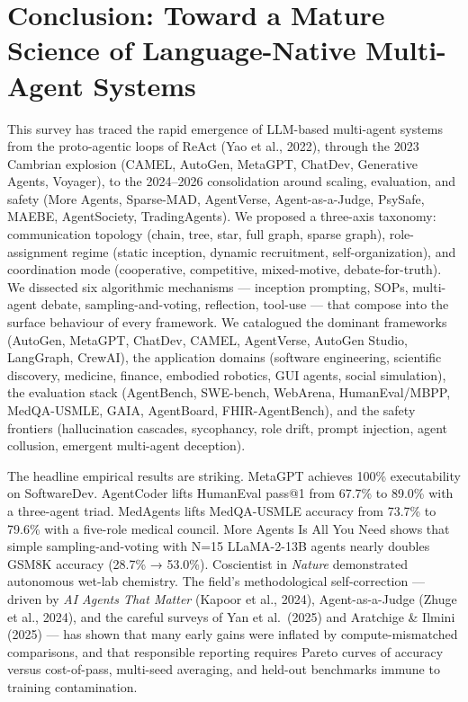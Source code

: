 \section{Conclusion: Toward a Mature Science of Language-Native Multi-Agent Systems}\label{conclusion-toward-a-mature-science-of-language-native-multi-agent-systems}

This survey has traced the rapid emergence of LLM-based multi-agent systems from the proto-agentic loops of ReAct (Yao et al., 2022), through the 2023 Cambrian explosion (CAMEL, AutoGen, MetaGPT, ChatDev, Generative Agents, Voyager), to the 2024--2026 consolidation around scaling, evaluation, and safety (More Agents, Sparse-MAD, AgentVerse, Agent-as-a-Judge, PsySafe, MAEBE, AgentSociety, TradingAgents). We proposed a three-axis taxonomy: communication topology (chain, tree, star, full graph, sparse graph), role-assignment regime (static inception, dynamic recruitment, self-organization), and coordination mode (cooperative, competitive, mixed-motive, debate-for-truth). We dissected six algorithmic mechanisms --- inception prompting, SOPs, multi-agent debate, sampling-and-voting, reflection, tool-use --- that compose into the surface behaviour of every framework. We catalogued the dominant frameworks (AutoGen, MetaGPT, ChatDev, CAMEL, AgentVerse, AutoGen Studio, LangGraph, CrewAI), the application domains (software engineering, scientific discovery, medicine, finance, embodied robotics, GUI agents, social simulation), the evaluation stack (AgentBench, SWE-bench, WebArena, HumanEval/MBPP, MedQA-USMLE, GAIA, AgentBoard, FHIR-AgentBench), and the safety frontiers (hallucination cascades, sycophancy, role drift, prompt injection, agent collusion, emergent multi-agent deception).

The headline empirical results are striking. MetaGPT achieves 100\% executability on SoftwareDev. AgentCoder lifts HumanEval pass@1 from 67.7\% to 89.0\% with a three-agent triad. MedAgents lifts MedQA-USMLE accuracy from 73.7\% to 79.6\% with a five-role medical council. More Agents Is All You Need shows that simple sampling-and-voting with N=15 LLaMA-2-13B agents nearly doubles GSM8K accuracy (28.7\% → 53.0\%). Coscientist in \emph{Nature} demonstrated autonomous wet-lab chemistry. The field's methodological self-correction --- driven by \emph{AI Agents That Matter} (Kapoor et al., 2024), Agent-as-a-Judge (Zhuge et al., 2024), and the careful surveys of Yan et al.~(2025) and Aratchige \& Ilmini (2025) --- has shown that many early gains were inflated by compute-mismatched comparisons, and that responsible reporting requires Pareto curves of accuracy versus cost-of-pass, multi-seed averaging, and held-out benchmarks immune to training contamination.

